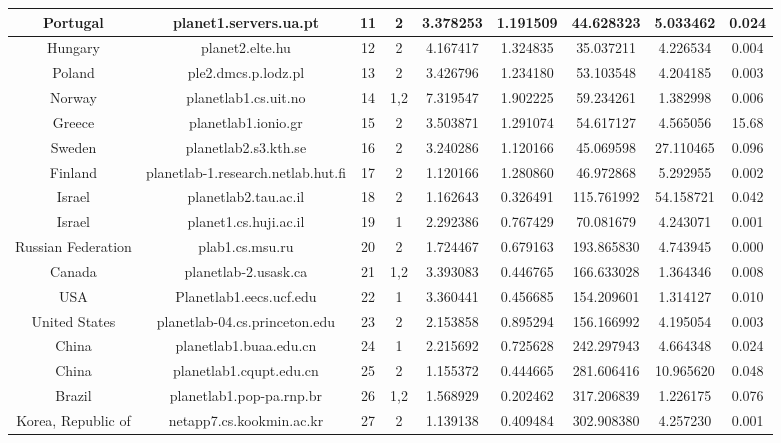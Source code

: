 \begin{table*} [tb]
\begin{tabular}{|c|c|c|c|c|c|c|c|c|}
        Portugal & planet1.servers.ua.pt                & 11  &  2 &3.378253&1.191509&44.628323&5.033462&0.024\\\hline
        Hungary & planet2.elte.hu                       & 12  &  2 &4.167417&1.324835&35.037211&4.226534&0.004\\\hline
        Poland & ple2.dmcs.p.lodz.pl                    & 13  &  2 &3.426796&1.234180&53.103548&4.204185&0.003\\\hline
        Norway & planetlab1.cs.uit.no                   & 14  &1,2 &7.319547&1.902225&59.234261&1.382998&0.006\\\hline
        Greece & planetlab1.ionio.gr                    & 15  &  2 &3.503871&1.291074&54.617127&4.565056&15.68\\\hline
        Sweden & planetlab2.s3.kth.se                   & 16  &  2 &3.240286&1.120166&45.069598&27.110465&0.096\\\hline
        Finland & planetlab-1.research.netlab.hut.fi    & 17  &  2 &1.120166&1.280860&46.972868&5.292955&0.002\\\hline
        Israel & planetlab2.tau.ac.il                   & 18  &  2 &1.162643&0.326491&115.761992&54.158721&0.042\\\hline
        Israel & planet1.cs.huji.ac.il                  & 19  &  1 &2.292386&0.767429&70.081679&4.243071&0.001\\\hline
        Russian Federation & plab1.cs.msu.ru            & 20  &  2 &1.724467&0.679163&193.865830&4.743945&0.000\\\hline
        Canada & planetlab-2.usask.ca                   & 21  &1,2 &3.393083&0.446765&166.633028&1.364346&0.008\\\hline
        USA & Planetlab1.eecs.ucf.edu                   & 22  &  1 &3.360441&0.456685&154.209601&1.314127&0.010\\\hline
        United States & planetlab-04.cs.princeton.edu   & 23  &  2 &2.153858&0.895294&156.166992&4.195054&0.003\\\hline
        China & planetlab1.buaa.edu.cn                  & 24  &  1 &2.215692&0.725628&242.297943&4.664348&0.024\\\hline
        China & planetlab1.cqupt.edu.cn                 & 25  &  2 &1.155372&0.444665&281.606416&10.965620&0.048\\\hline
        Brazil & planetlab1.pop-pa.rnp.br               & 26  &1,2 &1.568929&0.202462&317.206839&1.226175&0.076\\\hline
        Korea, Republic of & netapp7.cs.kookmin.ac.kr   & 27  &  2 &1.139138&0.409484&302.908380&4.257230&0.001\\\hline

\end{tabular}
\end{table*}
